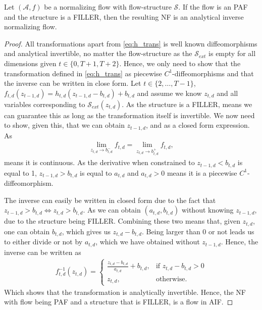 \begin{proposition}
    Let \((\mathcal{A}, f)\) be a normalizing flow with flow-structure \(\mathcal{S}\). If the flow is an PAF and the structure is 
    a FILLER, then the resulting NF is an analytical inverse normalizing flow.
\end{proposition}
\begin{proof}
    All transformations apart from \cref{eq:h_trans} is well known diffeomorphisms and analytical invertible, no matter
    the flow-structure as the \(\mathcal{S}_{ext}\) is empty for all dimensions given \(t \in \{0,T+1,T+2\}\). Hence, we only need
    to show that the transformation defined in \cref{eq:h_trans} as piecewise \(C^1\)-diffeomorphisms and that the inverse can
    be written in close form. Let \(t \in \{2,\dots,T-1\}\), 
    \(f_{t,d}(z_{t-1,d}) = h_{t,d}(z_{t-1,d} - b_{t,d}) + b_{t,d}\) and assume we know \(z_{t,d}\) and all 
    variables corresponding to \(\mathcal{S}_{ext}(z_{t,d})\). As the structure is a FILLER, means we can guarantee this as long as
    the transformation itself is invertible. We now
    need to show, given this, that we can obtain \(z_{t-1,d}\), and as a closed form expression. As
    \begin{align*}
        \lim_{z_{t,d} \rightarrow b_{t,d}^{-}} f_{t,d} = \lim_{z_{t,d} \rightarrow b_{t,d}^{+}} f_{t,d},
    \end{align*}
    means it is continuous. As the derivative when constrained to \(z_{t-1,d} < b_{t,d}\) is equal to 1, \(z_{t-1,d} > b_{t,d}\) 
    is equal to \(a_{t,d}\) and \(a_{t,d} > 0\) means it is a piecewise \(C^1\)-diffeomorphism.

    The inverse can easily be written in closed form due to the fact that \(z_{t-1,d} > b_{t,d} \iff z_{t,d} > b_{t,d}\). 
    As we can obtain \((a_{t,d}, b_{t,d})\) without knowing \(z_{t-1,d}\), due to the structure being FILLER. Combining these two
    means that, given \(z_{t,d}\), one can obtain \(b_{t,d}\), which gives us \(z_{t,d}-b_{t,d}\). Being larger than 0 or not leads
    us to either divide or not by \(a_{t,d}\), which we have obtained without \(z_{t-1,d}\). Hence, the inverse can be written as
    \begin{align*}
        f_{t,d}^{-1}(z_{t,d}) =
        \begin{cases}
            \frac{z_{t,d} - b_{t,d}}{a_{t,d}} + b_{t,d}, & \text{if \(z_{t,d} - b_{t,d} > 0\)}\\
            z_{t,d}, & \text{otherwise}.
        \end{cases}
    \end{align*}
    Which shows that the transformation is analytically invertible. Hence, the NF with flow being PAF and a structure that is FILLER,
    is a flow in AIF.
\end{proof}

